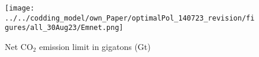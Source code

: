 % 



\begin{figure}
\caption{Net CO$_2$ emission limit in gigatons  (Gt)}\label{fig:emlimit}
\texttt{[image: ../../codding\_model/own\_Paper/optimalPol\_140723\_revision/figures/all\_30Aug23/Emnet.png]}
\end{figure}

